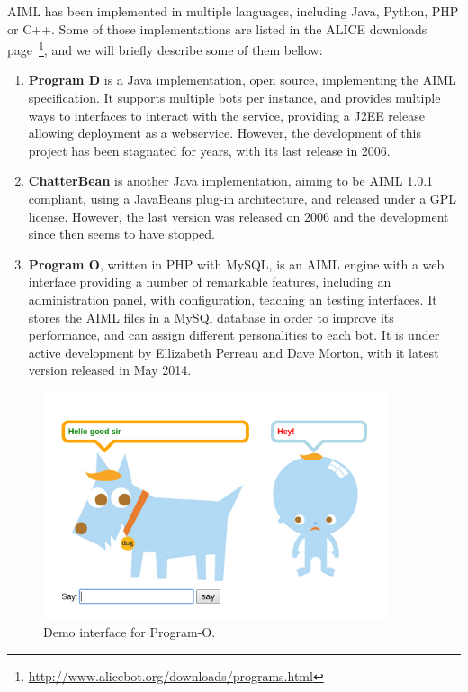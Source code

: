 \ac{AIML} has been implemented in multiple languages, including Java, Python, PHP or C++. Some of those implementations are listed in the ALICE downloads page~\footnote{\url{http://www.alicebot.org/downloads/programs.html}}, and we will briefly describe some of them bellow:

\begin{enumerate}
 \item \textbf{Program D} is a Java implementation, open source, implementing the \ac{AIML} specification. It supports multiple bots per instance, and provides multiple ways to interfaces to interact with the service, providing a J2EE release allowing deployment as a webservice. However, the development of this project has been stagnated for years, with its last release in 2006.
 \item \textbf{ChatterBean} is another Java implementation, aiming to be \ac{AIML} 1.0.1 compliant, using a JavaBeans plug-in architecture, and released under a GPL license. However, the last version was released on 2006 and the development since then seems to have stopped.
 \item \textbf{Program O}, written in PHP with MySQL, is an \ac{AIML} engine with a web interface providing a number of remarkable features, including an administration panel, with configuration, teaching an testing interfaces. It stores the \ac{AIML} files in a MySQl database in order to improve its performance, and can assign different personalities to each bot. It is under active development by Ellizabeth Perreau and Dave Morton, with it latest version released in May 2014. 
\end{enumerate}


\begin{figure}[!htbp]
    \centering
    \includegraphics[width=0.9\textwidth]{img/screens/programo.png}
    \caption{Demo interface for Program-O.}
    \label{fig:programo1}
\end{figure}


